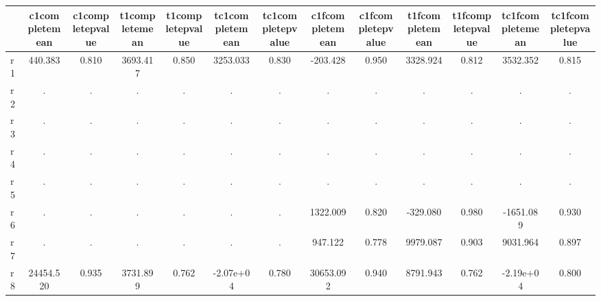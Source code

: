 \begin{table}[htbp]
\begin{tabular}{lcccccccccccc} \hline \hline
 & c1completemean  & c1completepvalue  & t1completemean  & t1completepvalue  & tc1completemean  & tc1completepvalue  & c1fcompletemean  & c1fcompletepvalue  & t1fcompletemean  & t1fcompletepvalue  & tc1fcompletemean  & tc1fcompletepvalue  \\  \hline 
r1 &   440.383 &     0.810 &  3693.417 &     0.850 &  3253.033 &     0.830 &  -203.428 &     0.950 &  3328.924 &     0.812 &  3532.352 &     0.815 \\  
r2 &         . &         . &         . &         . &         . &         . &         . &         . &         . &         . &         . &         . \\  
r3 &         . &         . &         . &         . &         . &         . &         . &         . &         . &         . &         . &         . \\  
r4 &         . &         . &         . &         . &         . &         . &         . &         . &         . &         . &         . &         . \\  
r5 &         . &         . &         . &         . &         . &         . &         . &         . &         . &         . &         . &         . \\  
r6 &         . &         . &         . &         . &         . &         . &  1322.009 &     0.820 &  -329.080 &     0.980 & -1651.089 &     0.930 \\  
r7 &         . &         . &         . &         . &         . &         . &   947.122 &     0.778 &  9979.087 &     0.903 &  9031.964 &     0.897 \\  
r8 & 24454.520 &     0.935 &  3731.899 &     0.762 & -2.07e+04 &     0.780 & 30653.092 &     0.940 &  8791.943 &     0.762 & -2.19e+04 &     0.800 \\  
\hline \hline \end{tabular}
\end{table}
